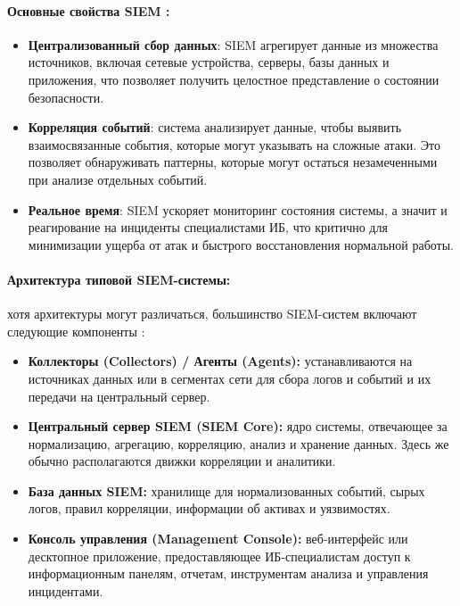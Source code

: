 \paragraph*{Основные свойства SIEM \cite{IBMSIEM}:}
\begin{itemize}
    \item \textbf{Централизованный сбор данных}: SIEM агрегирует данные из множества источников, включая сетевые устройства, серверы, базы данных и приложения, что позволяет получить целостное представление о состоянии безопасности.
    \item \textbf{Корреляция событий}: система анализирует данные, чтобы выявить взаимосвязанные события, которые могут указывать на сложные атаки. Это позволяет обнаруживать паттерны, которые могут остаться незамеченными при анализе отдельных событий.
    \item \textbf{Реальное время}: SIEM ускоряет мониторинг состояния системы, а значит и реагирование на инциденты специалистами ИБ, что критично для минимизации ущерба от атак и быстрого восстановления нормальной работы.
\end{itemize}

\paragraph*{Архитектура типовой SIEM-системы:} хотя архитектуры могут различаться, большинство SIEM-систем включают следующие компоненты \cite{IBMSIEM}:
\begin{itemize}
    \item \textbf{Коллекторы (Collectors) / Агенты (Agents):} устанавливаются на источниках данных или в сегментах сети для сбора логов и событий и их передачи на центральный сервер.
    \item \textbf{Центральный сервер SIEM (SIEM Core):} ядро системы, отвечающее за нормализацию, агрегацию, корреляцию, анализ и хранение данных. Здесь же обычно располагаются движки корреляции и аналитики.
    \item \textbf{База данных SIEM:} хранилище для нормализованных событий, сырых логов, правил корреляции, информации об активах и уязвимостях.
    \item \textbf{Консоль управления (Management Console):} веб-интерфейс или десктопное приложение, предоставляющее ИБ-специалистам доступ к информационным панелям, отчетам, инструментам анализа и управления инцидентами.
\end{itemize}

